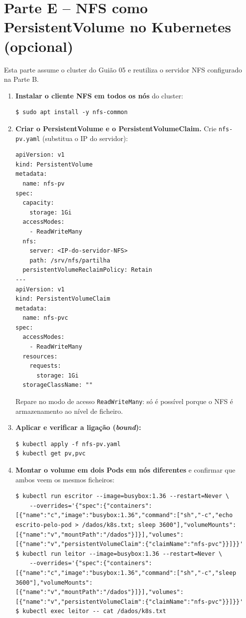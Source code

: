 \documentclass[11pt,a4paper]{article}
\begin{document}
\section{Parte E -- NFS como PersistentVolume no Kubernetes (opcional)}
Esta parte assume o cluster do Guião 05 e reutiliza o servidor NFS configurado na Parte B.

\begin{enumerate}[label=\arabic*.]
    \item \textbf{Instalar o cliente NFS em todos os nós} do cluster:
\begin{lstlisting}
$ sudo apt install -y nfs-common
\end{lstlisting}

    \item \textbf{Criar o PersistentVolume e o PersistentVolumeClaim.} Crie \texttt{nfs-pv.yaml} (substitua o IP do servidor):
\begin{lstlisting}
apiVersion: v1
kind: PersistentVolume
metadata:
  name: nfs-pv
spec:
  capacity:
    storage: 1Gi
  accessModes:
    - ReadWriteMany
  nfs:
    server: <IP-do-servidor-NFS>
    path: /srv/nfs/partilha
  persistentVolumeReclaimPolicy: Retain
---
apiVersion: v1
kind: PersistentVolumeClaim
metadata:
  name: nfs-pvc
spec:
  accessModes:
    - ReadWriteMany
  resources:
    requests:
      storage: 1Gi
  storageClassName: ""
\end{lstlisting}
    Repare no modo de acesso \texttt{ReadWriteMany}: só é possível porque o NFS é armazenamento ao nível de ficheiro.

    \item \textbf{Aplicar e verificar a ligação (\emph{bound}):}
\begin{lstlisting}
$ kubectl apply -f nfs-pv.yaml
$ kubectl get pv,pvc
\end{lstlisting}

    \item \textbf{Montar o volume em dois Pods em nós diferentes} e confirmar que ambos veem os mesmos ficheiros:
\begin{lstlisting}
$ kubectl run escritor --image=busybox:1.36 --restart=Never \
    --overrides='{"spec":{"containers":[{"name":"c","image":"busybox:1.36","command":["sh","-c","echo escrito-pelo-pod > /dados/k8s.txt; sleep 3600"],"volumeMounts":[{"name":"v","mountPath":"/dados"}]}],"volumes":[{"name":"v","persistentVolumeClaim":{"claimName":"nfs-pvc"}}]}}'
$ kubectl run leitor --image=busybox:1.36 --restart=Never \
    --overrides='{"spec":{"containers":[{"name":"c","image":"busybox:1.36","command":["sh","-c","sleep 3600"],"volumeMounts":[{"name":"v","mountPath":"/dados"}]}],"volumes":[{"name":"v","persistentVolumeClaim":{"claimName":"nfs-pvc"}}]}}'
$ kubectl exec leitor -- cat /dados/k8s.txt
\end{lstlisting}


\end{enumerate}
\end{document}
